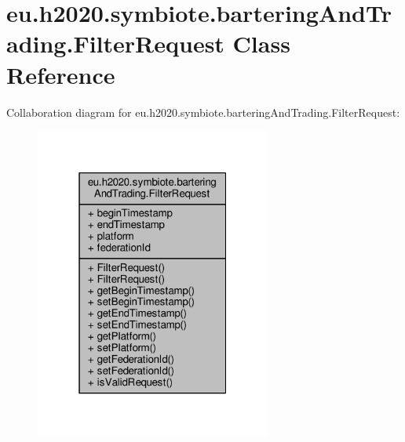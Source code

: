 \hypertarget{classeu_1_1h2020_1_1symbiote_1_1barteringAndTrading_1_1FilterRequest}{}\section{eu.\+h2020.\+symbiote.\+bartering\+And\+Trading.\+Filter\+Request Class Reference}
\label{classeu_1_1h2020_1_1symbiote_1_1barteringAndTrading_1_1FilterRequest}


Collaboration diagram for eu.\+h2020.\+symbiote.\+bartering\+And\+Trading.\+Filter\+Request\+:
\nopagebreak
\begin{figure}[H]
\begin{center}
\leavevmode
\includegraphics[width=220pt]{classeu_1_1h2020_1_1symbiote_1_1barteringAndTrading_1_1FilterRequest__coll__graph}
\end{center}
\end{figure}
